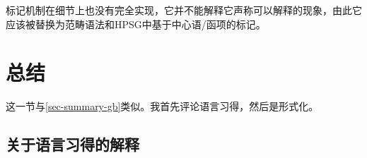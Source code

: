 标记机制在细节上也没有完全实现，它并不能解释它声称可以解释的现象，由此它应该被替换为范畴语法和HPSG中基于中心语/函项的标记。

\section{总结}

这一节与\ref{sec-summary-gb}类似。我首先评论语言习得，然后是形式化。

\subsection{关于语言习得的解释}

